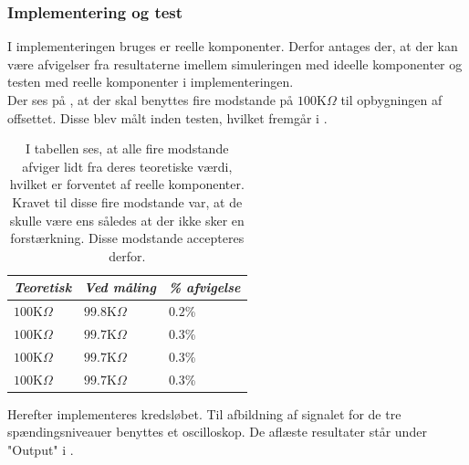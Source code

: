 \subsubsection{Implementering og test}
I implementeringen bruges er reelle komponenter. Derfor antages der, at der kan være afvigelser fra resultaterne imellem simuleringen med ideelle komponenter og testen med reelle komponenter i implementeringen. \\
Der ses på , at der skal benyttes fire modstande på $100$K$\Omega$ til opbygningen af offsettet. Disse blev målt inden testen, hvilket fremgår i .
\begin{table}[H]
	\centering
	\begin{tabular}{|l|l|l|}
		\hline
		\textit{Teoretisk} & \textit{Ved måling} & \textit{\% afvigelse} \\ \hline
		$100$K$\Omega$       & $99.8$K$\Omega$       & $0.2$\%               \\ \hline
		$100$K$\Omega$       & $99.7$K$\Omega$       & $0.3$\%               \\ \hline
		$100$K$\Omega$       & $99.7$K$\Omega$       & $0.3$\%               \\ \hline
		$100$K$\Omega$       & $99.7$K$\Omega$       & $0.3$\%               \\ \hline
	\end{tabular}
	\caption{I tabellen ses, at alle fire modstande afviger lidt fra deres teoretiske værdi, hvilket er forventet af reelle komponenter. Kravet til disse fire modstande var, at de skulle være ens således at der ikke sker en forstærkning. Disse modstande accepteres derfor.}
	\label{Tab:modstand_offset}
\end{table}
\noindent Herefter implementeres kredsløbet. Til afbildning af signalet for de tre spændingsniveauer benyttes et oscilloskop. De aflæste resultater står under "Output" i .
